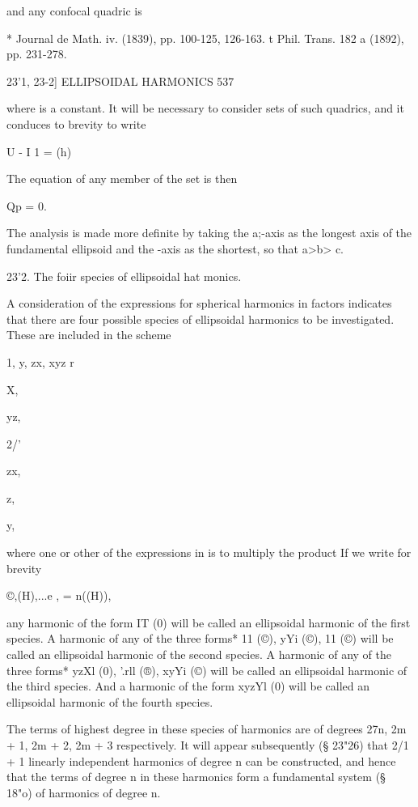 and any confocal quadric is



* Journal de Math. iv. (1839), pp. 100-125, 126-163. t Phil. Trans.
182 a (1892), pp. 231-278.



23'1, 23-2] ELLIPSOIDAL HARMONICS 537

where is a constant. It will be necessary to consider sets of such
quadrics, and it conduces to brevity to write

U - I 1 = (h)

The equation of any member of the set is then

Qp = 0.

The analysis is made more definite by taking the a;-axis as the
longest axis of the fundamental ellipsoid and the -axis as the
shortest, so that a>b> c.

23'2. The foiir species of ellipsoidal hat monics.

A consideration of the expressions for spherical harmonics in factors
indicates that there are four possible species of ellipsoidal
harmonics to be investigated. These are included in the scheme



1, y, zx, xyz r%



X,


yz,


2/'


zx,


z,


 y,



where one or other of the expressions in is to multiply the product If
we write for brevity

©,(H),...e , = n((H)),

any harmonic of the form IT (0) will be called an ellipsoidal harmonic
of the first species. A harmonic of any of the three forms* 11 (©),
yYi (©), 11 (©) will be called an ellipsoidal harmonic of the second
species. A harmonic of any of the three forms* yzXl (0), '.rll (®),
xyYi (©) will be called an ellipsoidal harmonic of the third species.
And a harmonic of the form xyzYl (0) will be called an ellipsoidal
harmonic of the fourth species.

The terms of highest degree in these species of harmonics are of
degrees 27n, 2m + 1, 2m + 2, 2m + 3 respectively. It will appear
subsequently (§ 23"26) that 2/1 + 1 linearly independent harmonics of
degree n can be constructed, and hence that the terms of degree n in
these harmonics form a fundamental system (§ 18"o) of harmonics of
degree n.


